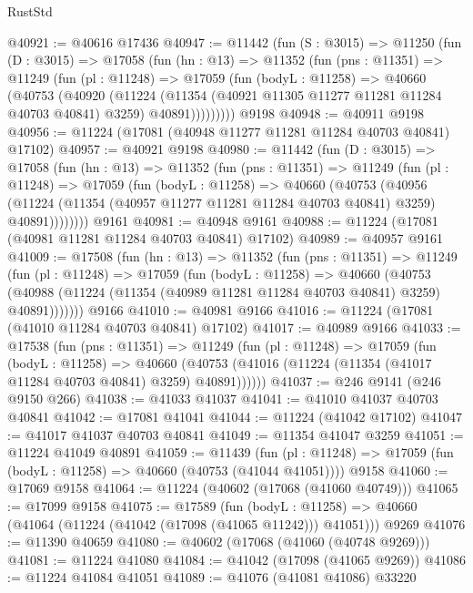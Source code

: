 \begin{lexlean}{RustStd}
\begin{coremodule}
@40921 := @40616 @17436
@40947 := @11442
    (fun (S : @3015) =>
    @11250
      (fun (D : @3015) =>
      @17058
        (fun (hn : @13) =>
        @11352
          (fun (pns : @11351) =>
          @11249
            (fun (pl : @11248) =>
            @17059
              (fun (bodyL : @11258) =>
              @40660
                (@40753
                  (@40920
                    (@11224
                      (@11354 (@40921 @11305 @11277 @11281 @11284 @40703 @40841) @3259)
                      @40891)))))))))
    @9198
@40948 := @40911 @9198
@40956 := @11224 (@17081 (@40948 @11277 @11281 @11284 @40703 @40841) @17102)
@40957 := @40921 @9198
@40980 := @11442
    (fun (D : @3015) =>
    @17058
      (fun (hn : @13) =>
      @11352
        (fun (pns : @11351) =>
        @11249
          (fun (pl : @11248) =>
          @17059
            (fun (bodyL : @11258) =>
            @40660
              (@40753
                (@40956
                  (@11224 (@11354 (@40957 @11277 @11281 @11284 @40703 @40841) @3259) @40891))))))))
    @9161
@40981 := @40948 @9161
@40988 := @11224 (@17081 (@40981 @11281 @11284 @40703 @40841) @17102)
@40989 := @40957 @9161
@41009 := @17508
    (fun (hn : @13) =>
    @11352
      (fun (pns : @11351) =>
      @11249
        (fun (pl : @11248) =>
        @17059
          (fun (bodyL : @11258) =>
          @40660
            (@40753
              (@40988 (@11224 (@11354 (@40989 @11281 @11284 @40703 @40841) @3259) @40891)))))))
    @9166
@41010 := @40981 @9166
@41016 := @11224 (@17081 (@41010 @11284 @40703 @40841) @17102)
@41017 := @40989 @9166
@41033 := @17538
    (fun (pns : @11351) =>
    @11249
      (fun (pl : @11248) =>
      @17059
        (fun (bodyL : @11258) =>
        @40660 (@40753 (@41016 (@11224 (@11354 (@41017 @11284 @40703 @40841) @3259) @40891))))))
@41037 := @246 @9141 (@246 @9150 @266)
@41038 := @41033 @41037
@41041 := @41010 @41037 @40703 @40841
@41042 := @17081 @41041
@41044 := @11224 (@41042 @17102)
@41047 := @41017 @41037 @40703 @40841
@41049 := @11354 @41047 @3259
@41051 := @11224 @41049 @40891
@41059 := @11439
    (fun (pl : @11248) => @17059 (fun (bodyL : @11258) => @40660 (@40753 (@41044 @41051))))
    @9158
@41060 := @17069 @9158
@41064 := @11224 (@40602 (@17068 (@41060 @40749)))
@41065 := @17099 @9158
@41075 := @17589
    (fun (bodyL : @11258) => @40660 (@41064 (@11224 (@41042 (@17098 (@41065 @11242))) @41051)))
    @9269
@41076 := @11390 @40659
@41080 := @40602 (@17068 (@41060 (@40748 @9269)))
@41081 := @11224 @41080
@41084 := @41042 (@17098 (@41065 @9269))
@41086 := @11224 @41084 @41051
@41089 := @41076 (@41081 @41086) @33220

\end{coremodule}
\end{lexlean}
